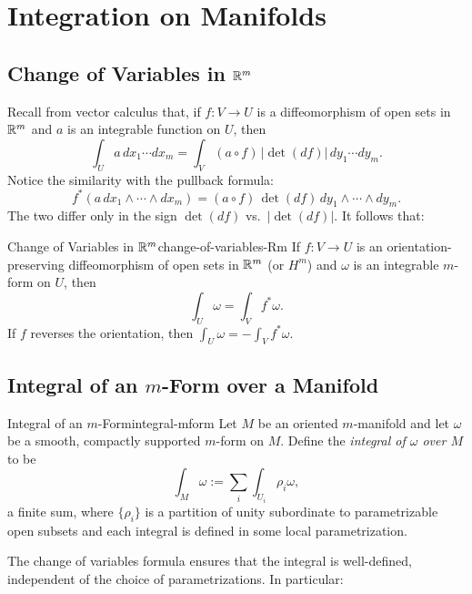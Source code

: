 
\section{Integration on Manifolds}

\subsection{Change of Variables in $\mathbb{R}^m$}

Recall from vector calculus that, if $f \colon V \to U$ is a diffeomorphism of open sets in $\mathbb{R}^m$ and $a$ is an integrable function on $U$, then
\[
    \int_U a\, dx_1 \cdots dx_m = \int_V (a \circ f)\, |\!\det(df)|\, dy_1 \cdots dy_m.
\]
Notice the similarity with the pullback formula:
\[
    f^*(a\, dx_1 \wedge \cdots \wedge dx_m) = (a \circ f)\, \det(df)\, dy_1 \wedge \cdots \wedge dy_m.
\]
The two differ only in the sign $\det(df)$ vs.\ $|\det(df)|$. It follows that:

\begin{theorem}{Change of Variables in $\mathbb{R}^m$}{change-of-variables-Rm}
    If $f \colon V \to U$ is an orientation-preserving diffeomorphism of open sets in $\mathbb{R}^m$ (or $H^m$) and $\omega$ is an integrable $m$-form on $U$, then
    \[
        \int_U \omega = \int_V f^*\omega.
    \]
    If $f$ reverses the orientation, then $\int_U \omega = -\int_V f^*\omega$.
\end{theorem}

\subsection{Integral of an $m$-Form over a Manifold}

\begin{definition}{Integral of an $m$-Form}{integral-mform}
    Let $M$ be an oriented $m$-manifold and let $\omega$ be a smooth, compactly supported $m$-form on $M$. Define the \emph{integral of $\omega$ over $M$} to be
    \[
        \int_M \omega := \sum_i \int_{U_i} \rho_i \omega,
    \]
    a finite sum, where $\{\rho_i\}$ is a partition of unity subordinate to parametrizable open subsets and each integral is defined in some local parametrization.
\end{definition}

The change of variables formula ensures that the integral is well-defined, independent of the choice of parametrizations. In particular:

